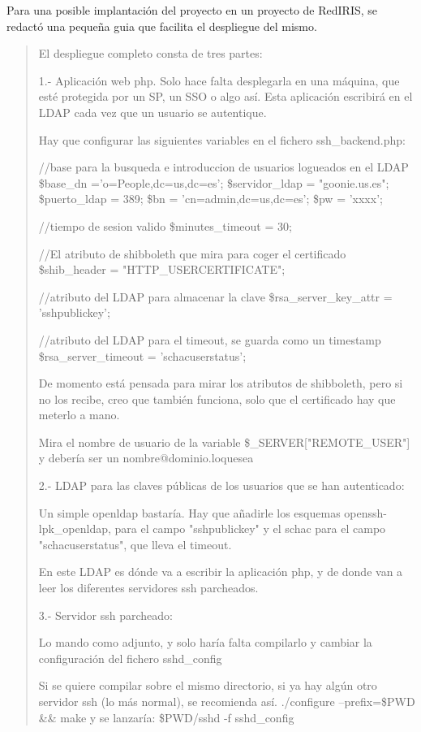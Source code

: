     Para una posible implantación del proyecto en un proyecto de RedIRIS,
    se redactó una pequeña guia que facilita el despliegue del mismo.

    \begin{quote}
El despliegue completo consta de tres partes:

1.- Aplicación web php. Solo hace falta desplegarla en una máquina, que
esté protegida por un SP, un SSO o algo así. Esta aplicación escribirá
en el LDAP cada vez que un usuario se autentique.

Hay que configurar las siguientes variables en el fichero
ssh\_backend.php:

//base para la busqueda e introduccion de usuarios logueados en el LDAP
\$base\_dn ='o=People,dc=us,dc=es';
\$servidor\_ldap = "goonie.us.es";
\$puerto\_ldap = 389;
\$bn = 'cn=admin,dc=us,dc=es';
\$pw = 'xxxx';

//tiempo de sesion valido
\$minutes\_timeout = 30;

//El atributo de shibboleth que mira para coger el certificado
\$shib\_header = "HTTP\_USERCERTIFICATE";

//atributo del LDAP para almacenar la clave
\$rsa\_server\_key\_attr = 'sshpublickey';

//atributo del LDAP para el timeout, se guarda como un timestamp
\$rsa\_server\_timeout = 'schacuserstatus';

De momento está pensada para mirar los atributos de shibboleth, pero si
no los recibe, creo que también funciona, solo que el certificado hay
que meterlo a mano.

Mira el nombre de usuario de la variable \$\_SERVER["REMOTE\_USER"] y
debería ser un nombre@dominio.loquesea

2.- LDAP para las claves públicas de los usuarios que se han
autenticado:

Un simple openldap bastaría. Hay que añadirle los esquemas
openssh-lpk\_openldap, para el campo "sshpublickey" y el schac para el
campo "schacuserstatus", que lleva el timeout.

En este LDAP es dónde va a escribir la aplicación php, y de donde van a
leer los diferentes servidores ssh parcheados.

3.- Servidor ssh parcheado:

Lo mando como adjunto, y solo haría falta compilarlo y cambiar la
configuración del fichero sshd\_config

Si se quiere compilar sobre el mismo directorio, si ya hay algún otro
servidor ssh (lo más normal), se recomienda así.
./configure --prefix=\$PWD \&\& make
y se lanzaría:
\$PWD/sshd -f sshd\_config


\end{quote}
